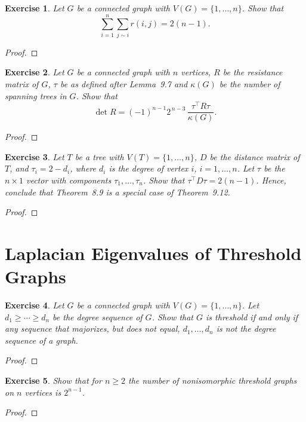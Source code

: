 \documentclass[11pt]{article}
\newtheorem{exercise}{Exercise}[section]
\theoremstyle{definition}
\begin{document}
\begin{exercise}
Let $G$ be a connected graph with $V(G)=\{1,\ldots,n\}$. Show that
\[
\sum_{i=1}^n\sum_{j\sim i} r(i,j)=2(n-1).
\]
\end{exercise}
\begin{proof}
\end{proof}

\begin{exercise}
Let $G$ be a connected graph with $n$ vertices, $R$ be the resistance matrix of $G$, $\tau$ be as
defined after Lemma~9.7 and $\kappa(G)$ be the number of spanning trees in $G$. Show that
\[
\det R = (-1)^{n-1}2^{\,n-3}\,\frac{\tau^\top R \tau}{\kappa(G)}.
\]
\end{exercise}
\begin{proof}
\end{proof}

\begin{exercise}
Let $T$ be a tree with $V(T)=\{1,\ldots,n\}$, $D$ be the distance matrix of $T$, and
$\tau_i=2-d_i$, where $d_i$ is the degree of vertex $i$, $i=1,\ldots,n$. Let $\tau$ be the
$n\times 1$ vector with components $\tau_1,\ldots,\tau_n$. Show that $\tau^\top D\tau=2(n-1)$.
Hence, conclude that Theorem~8.9 is a special case of Theorem~9.12.
\end{exercise}
\begin{proof}
\end{proof}

\clearpage
\section{Laplacian Eigenvalues of Threshold Graphs}

\begin{exercise}
Let $G$ be a connected graph with $V(G)=\{1,\ldots,n\}$. Let $d_1\ge \cdots \ge d_n$ be the degree
sequence of $G$. Show that $G$ is threshold if and only if any sequence that majorizes, but does
not equal, $d_1,\ldots,d_n$ is not the degree sequence of a graph.
\end{exercise}
\begin{proof}
\end{proof}

\begin{exercise}
Show that for $n\ge 2$ the number of nonisomorphic threshold graphs on $n$ vertices is $2^{n-1}$.
\end{exercise}
\begin{proof}
\end{proof}
\end{document}
